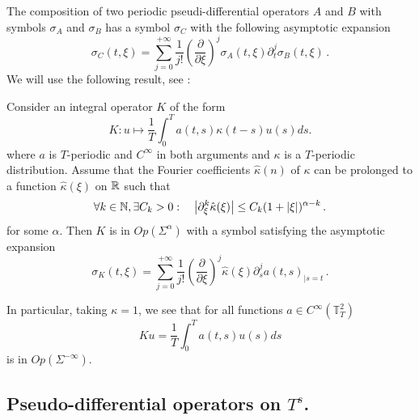 \documentclass[a4paper]{article}
\begin{document}
The composition of two periodic pseudi-differential operators $A$ and $B$ with symbols $\sigma_A$ and $\sigma_B$ has a symbol $\sigma_C$ with the following asymptotic expansion
\begin{equation}
	\label{a_diese_b}
	\sigma_C(t,\xi) = \sum_{j = 0}^{+\infty}\frac{1}{j!} \left(\frac{\partial}{\partial \xi}\right)^j \sigma_A(t,\xi) \partial_t^j \sigma_B(t,\xi)\,.
\end{equation}
We will use the following result, see \cite{thrunen1998symbol}:
\begin{The}
	\label{thrunen}
	Consider an integral operator $K$ of the form 
	\[K : u \mapsto \frac{1}{T}\int_{0}^T a(t,s) \kappa(t-s) u(s) ds.\]
	where $a$ is $T$-periodic and $C^{\infty}$ in both arguments and $\kappa$ is a $T$-periodic distribution. Assume that the Fourier coefficients $\hat{\kappa}(n)$ of $\kappa$ can be prolonged to a function $\hat{\kappa}(\xi)$ on $\mathbb{R}$ such that
	\[\forall k \in \mathbb{N},  \exists C_k > 0: \quad \left\lvert \partial^k_\xi \hat{\kappa}(\xi) \right\rvert \leq C_k (1 + \left\lvert \xi \right\rvert)^{\alpha - k}\,.\]
	for some $\alpha$. Then $K$ is in $\textit{Op}(\Sigma^\alpha)$ with a symbol satisfying the asymptotic expansion
	\[\sigma_K(t, \xi) = \sum_{j = 0}^{+ \infty} \frac{1}{j!} \left(\frac{\partial}{\partial \xi}\right)^j \hat{\kappa}(\xi) \partial_s^ja(t,s)_{|s = t}\,.\]
\end{The}
\noindent In particular, taking $\kappa = 1$, we see that for all functions $a \in C^{\infty}(\mathbb{T}_T^2)$
\[Ku = \frac{1}{T}\int_{0}^{T} a(t,s) u(s) ds\]
is in $Op\left(\Sigma^{-\infty}\right)$.

\subsection{Pseudo-differential operators on $T^s$.}
\end{document}
